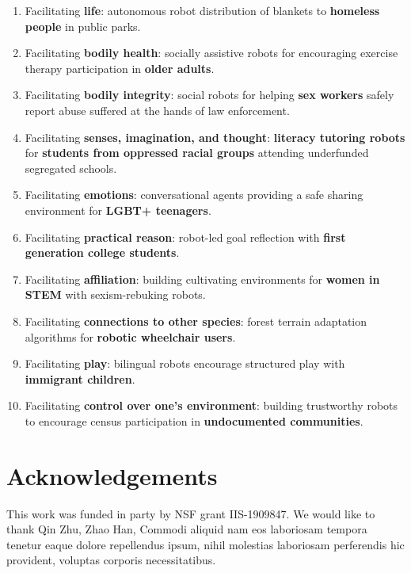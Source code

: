 \documentclass[letterpaper]{article} %
\begin{document}
\begin{enumerate}
\item Facilitating \textbf{life}:  autonomous robot distribution of blankets to \textbf{homeless people} in public parks.
\item Facilitating \textbf{bodily health}: socially assistive robots for encouraging exercise therapy participation in \textbf{older adults}.
\item Facilitating \textbf{bodily integrity}: social robots for helping \textbf{sex workers} safely report abuse suffered at the hands of law enforcement.
\item Facilitating \textbf{senses, imagination, and thought}:  \textbf{literacy tutoring robots} for \textbf{students from oppressed racial groups} attending underfunded segregated schools.
\item Facilitating \textbf{emotions}:  conversational agents providing a safe sharing environment for \textbf{LGBT+ teenagers}.
\item Facilitating \textbf{practical reason}: robot-led goal reflection with \textbf{first generation college students}.
\item Facilitating \textbf{affiliation}: building cultivating environments for \textbf{women in STEM} with sexism-rebuking robots.
\item Facilitating \textbf{connections to other species}: forest terrain adaptation algorithms for \textbf{robotic wheelchair users}.
\item Facilitating \textbf{play}:  bilingual robots encourage structured play with \textbf{immigrant children}.
\item Facilitating \textbf{control over one's environment}: building trustworthy robots to encourage census participation in \textbf{undocumented communities}.
\end{enumerate}

\vspace{-0.77mm}
\vspace{-1.93mm}
\section*{Acknowledgements}
This work was funded in party by NSF grant IIS-1909847. We would like to thank Qin Zhu, Zhao Han,  Commodi aliquid nam eos laboriosam tempora tenetur eaque dolore repellendus ipsum, nihil molestias laboriosam perferendis hic provident, voluptas corporis necessitatibus.\clearpage

\end{document}
